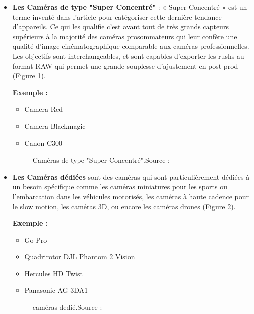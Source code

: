 \begin{itemize}
 	\item \textbf{Les Caméras de type "Super Concentré"} : « Super Concentré » est un terme inventé dans l'article \cite{noauthor_les_2015} pour catégoriser cette dernière tendance d’appareils. Ce qui les qualifie c’est avant tout de très grands capteurs supérieurs à la majorité des caméras prosommateurs qui leur confère une qualité d’image cinématographique comparable aux caméras professionnelles. Les objectifs sont interchangeables, et sont capables d’exporter les rushs au format RAW qui permet une grande souplesse d’ajustement en post-prod (Figure \ref{fig:Caméras de type "Super Concentré"}).
 	
 	\textbf{Exemple :}
 	\begin{itemize}
 		\item Camera Red
 		\item Camera Blackmagic
 		\item Canon C300
 	\end{itemize}
 	 
 	 \begin{figure}[H]%
 	 	\center%
 	 	\setlength{\fboxsep}{5pt}%
 	 	\setlength{\fboxrule}{0.5pt}%
 	 \caption[Caméras de type "Super Concentré" ]{Caméras de type "Super Concentré".Source :\cite{noauthor_les_2015}}
 	 \label{fig:Caméras de type "Super Concentré"}
 	 \end{figure}
 	 
 	\item \textbf{Les Caméras dédiées} sont des caméras qui sont particulièrement dédiées à un besoin spécifique comme les caméras miniatures pour les sports ou l’embarcation dans les véhicules motorisés, les caméras à haute cadence pour le slow motion, les caméras 3D, ou encore les caméras drones (Figure \ref{fig:Caméras dedié}).
 	
 	\textbf{Exemple :}
 	
 	\begin{itemize}
 		\item Go Pro
 		\item Quadrirotor DJL Phantom 2 Vision
 		\item Hercules HD Twist
 		\item Panasonic AG 3DA1
 	\end{itemize}
 	
 	\begin{figure}[H]%
 		\center%
 		\setlength{\fboxsep}{5pt}%
 		\setlength{\fboxrule}{0.5pt}%
 		\caption[Caméras dedié]{caméras dedié.Source :\cite{noauthor_les_2015}}
 	\label{fig:Caméras dedié}
 	\end{figure}
 	
 \end{itemize}
 
